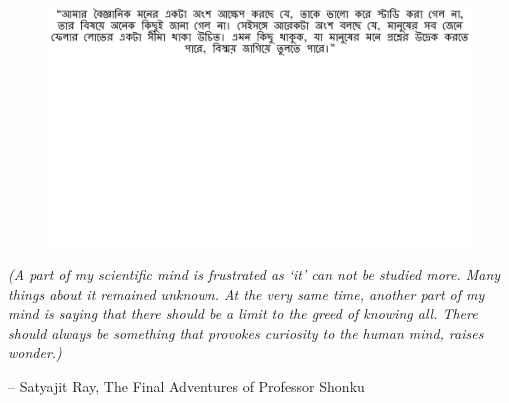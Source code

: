 \thispagestyle{empty}
{}

\vspace*{3cm}

\begin{center}
\begin{figure}
  \centering
  	\vspace{5cm}
    \includegraphics[width=\linewidth]{preamble/quote_1.pdf} 
\end{figure}
\vspace{-4cm}
\small
\emph{(A part of my scientific mind is frustrated as `it' can not be studied more. Many things about it remained unknown. At the very same time, another part of my mind is saying that there should be a limit to the greed of knowing all. There should always be something that provokes curiosity to the human mind, raises wonder.)}

\vspace{2em}
 -- Satyajit Ray, The Final Adventures of Professor Shonku 
\end{center}

\medskip
